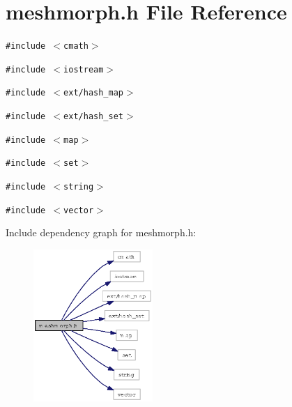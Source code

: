 \section{meshmorph.h File Reference}
\label{meshmorph_8h}
{\tt \#include $<$cmath$>$}\par
{\tt \#include $<$iostream$>$}\par
{\tt \#include $<$ext/hash\_\-map$>$}\par
{\tt \#include $<$ext/hash\_\-set$>$}\par
{\tt \#include $<$map$>$}\par
{\tt \#include $<$set$>$}\par
{\tt \#include $<$string$>$}\par
{\tt \#include $<$vector$>$}\par


Include dependency graph for meshmorph.h:\begin{figure}[H]
\begin{center}
\leavevmode
\includegraphics[width=128pt]{meshmorph_8h__incl}
\end{center}
\end{figure}


